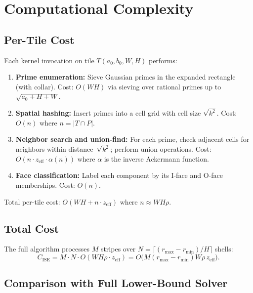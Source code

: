 \documentclass[11pt,a4paper]{article}
\theoremstyle{definition}
\theoremstyle{remark}
\begin{document}
\section{Computational Complexity}\label{sec:complexity}

\subsection{Per-Tile Cost}

Each kernel invocation on tile $T(a_0, b_0, W, H)$ performs:
\begin{enumerate}
  \item \textbf{Prime enumeration:} Sieve Gaussian primes in the
    expanded rectangle (with collar).  Cost: $O(WH)$ via sieving
    over rational primes up to $\sqrt{a_0 + H + W}$.
  \item \textbf{Spatial hashing:} Insert primes into a cell grid with
    cell size $\sqrt{k^2}$.  Cost: $O(n)$ where $n = |T \cap P|$.
  \item \textbf{Neighbor search and union-find:} For each prime, check
    adjacent cells for neighbors within distance~$\sqrt{k^2}$; perform
    union operations.  Cost: $O(n \cdot z_{\mathrm{eff}} \cdot
    \alpha(n))$ where $\alpha$ is the inverse Ackermann function.
  \item \textbf{Face classification:} Label each component by its
    I-face and O-face memberships.  Cost: $O(n)$.
\end{enumerate}

Total per-tile cost: $O(WH + n \cdot z_{\mathrm{eff}})$ where
$n \approx WH\rho$.

\subsection{Total Cost}

The full algorithm processes $M$ stripes over
$N = \lceil(r_{\max} - r_{\min})/H\rceil$ shells:
\begin{equation}\label{eq:cost}
  C_{\mathrm{ISE}} = M \cdot N \cdot O(WH\rho \cdot z_{\mathrm{eff}})
  = O\!\bigl(M(r_{\max} - r_{\min})W\rho \, z_{\mathrm{eff}}\bigr).
\end{equation}

\subsection{Comparison with Full Lower-Bound Solver}
\end{document}
